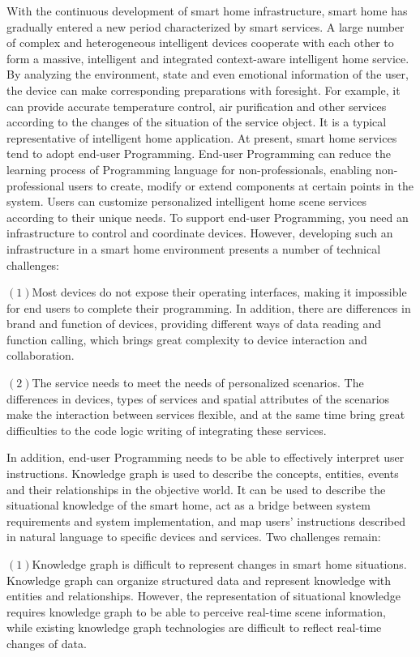 
With the continuous development of smart home infrastructure, smart home has gradually entered a new period characterized by smart services. A large number of complex and heterogeneous intelligent devices cooperate with each other to form a massive, intelligent and integrated context-aware intelligent home service. By analyzing the environment, state and even emotional information of the user, the device can make corresponding preparations with foresight. For example, it can provide accurate temperature control, air purification and other services according to the changes of the situation of the service object. It is a typical representative of intelligent home application. At present, smart home services tend to adopt end-user Programming. End-user Programming can reduce the learning process of Programming language for non-professionals, enabling non-professional users to create, modify or extend components at certain points in the system. Users can customize personalized intelligent home scene services according to their unique needs. To support end-user Programming, you need an infrastructure to control and coordinate devices. However, developing such an infrastructure in a smart home environment presents a number of technical challenges:

$(1)$Most devices do not expose their operating interfaces, making it impossible for end users to complete their programming. In addition, there are differences in brand and function of devices, providing different ways of data reading and function calling, which brings great complexity to device interaction and collaboration.

$(2)$The service needs to meet the needs of personalized scenarios. The differences in devices, types of services and spatial attributes of the scenarios make the interaction between services flexible, and at the same time bring great difficulties to the code logic writing of integrating these services.

In addition, end-user Programming needs to be able to effectively interpret user instructions. Knowledge graph is used to describe the concepts, entities, events and their relationships in the objective world. It can be used to describe the situational knowledge of the smart home, act as a bridge between system requirements and system implementation, and map users' instructions described in natural language to specific devices and services. Two challenges remain:	

$(1)$Knowledge graph is difficult to represent changes in smart home situations. Knowledge graph can organize structured data and represent knowledge with entities and relationships. However, the representation of situational knowledge requires knowledge graph to be able to perceive real-time scene information, while existing knowledge graph technologies are difficult to reflect real-time changes of data.

